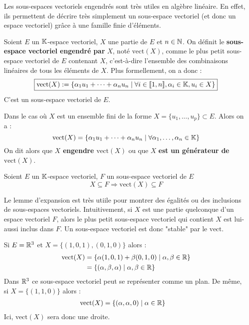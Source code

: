 Les sous-espaces vectoriels engendrés sont très utiles en algèbre linéaire. 
En effet, ils permettent de décrire très simplement un sous-espace vectoriel (et donc un espace vectoriel) grâce 
à une famille finie d'éléments. 

\begin{definition}
    Soient $E$ un $\mathbb{K}$-espace vectoriel, $X$ une partie de $E$ et $n \in \mathbb{N}$. 
    On définit le \textbf{sous-espace vectoriel engendré par} $X$, noté $\text{vect}(X)$, 
    comme le plus petit sous-espace vectoriel de $E$ contenant $X$, c'est-à-dire l'ensemble des combinaisons 
    linéaires de tous les éléments de $X$. Plus formellement, on a donc : 
        \[ \boxed{ \text{vect}(X) := \{\alpha_1 u_1 + \dots + \alpha_n u_n \; | \; \forall i \in \llbracket 1, n \rrbracket, \alpha_i \in \mathbb{K}, u_i \in X \} } \] 
    C'est un sous-espace vectoriel de $E$.  
\end{definition}

\begin{proposition}
    Dans le cas où $X$ est un ensemble fini de la forme $X = \{u_1, \dots, u_p\} \subset E$. 
    Alors on a : 
        \[ \text{vect}(X) = \{\alpha_1 u_1 + \dots + \alpha_n u_n \; | \; \forall \alpha_1, \dots, \alpha_n \in \mathbb{K}\} \] 
    On dit alors que \textbf{$X$ engendre $\text{vect}(X)$} ou que $X$ \textbf{est un générateur de $\text{vect}(X)$}. 
\end{proposition}

\begin{lemma}
    Soient $E$ un $\mathbb{K}$-espace vectoriel, $F$ un sous-espace vectoriel de $E$ 
        \[ \boxed{ X \subseteq F \Longrightarrow \text{vect}(X) \subseteq F } \] 
\end{lemma}

Le lemme d'expansion est très utiile pour montrer des égalités ou des inclusions de sous-espaces vectoriels. 
Intuitivement, si $X$ est une partie quelconque d'un espace vectoriel $F$, alors le plus petit sous-espace vectoriel qui 
contient $X$ est lui-aussi inclus dans $F$. Un sous-espace vectoriel est donc "stable" par le $\text{vect}$. 

\begin{example}
    Si $E = \mathbb{R}^3$ et $X = \{(1,0,1), (0,1,0)\}$ alors : 
        \begin{align*}
            \text{vect}(X) &= \{\alpha (1,0,1) + \beta (0,1,0) \; | \; \alpha, \beta \in \mathbb{R}\} \\ 
            &= \{(\alpha, \beta, \alpha) \; | \; \alpha, \beta \in \mathbb{R}\} 
        \end{align*}
    Dans $\mathbb{R}^3$ ce sous-espace vectoriel peut se représenter comme un plan. 
    De même, si $X = \{(1,1,0)\}$ alors : 
        \begin{align*}
            \text{vect}(X) &= \{(\alpha, \alpha, 0) \; | \; \alpha \in \mathbb{R}\} 
        \end{align*}
    Ici, $\text{vect}(X)$ sera donc une droite. 
\end{example}

